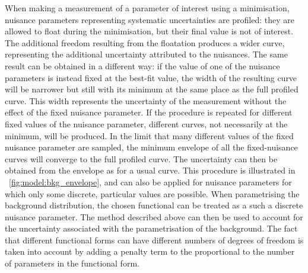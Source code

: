 When making a measurement of a parameter of interest using a \NLL minimisation, nuisance parameters representing systematic uncertainties are profiled: they are allowed to float during the minimisation, but their final value is not of interest. The additional freedom resulting from the floatation produces a wider \NLL curve, representing the additional uncertainty attributed to the nuisances. 
The same result can be obtained in a different way: if the value of one of the nuisance parameters is instead fixed at the best-fit value, the width of the resulting \NLL curve will be narrower but still with its minimum at the same place as the full profiled \NLL curve. This width represents the uncertainty of the measurement without the effect of the fixed nuisance parameter. If the procedure is repeated for different fixed values of the nuisance parameter, different \NLL curves, not necessarily at the minimum, will be produced. In the limit that many different values of the fixed nuisance parameter are sampled, the minimum envelope of all the fixed-nuisance \NLL curves will converge to the full profiled \NLL curve. The uncertainty can then be obtained from the envelope as for a usual \NLL curve. This procedure is illustrated in \Fig~\ref{fig:model:bkg_envelope}, and can also be applied for nuisance parameters for which only some discrete, particular values are possible. When parametrising the background distribution, the chosen functional can be treated as a such a discrete nuisance parameter. The method described above can then be used to account for the uncertainty associated with the parametrisation of the background. The fact that different functional forms can have different numbers of degrees of freedom is taken into account by adding a penalty term to the \NLL proportional to the number of parameters in the functional form. 

